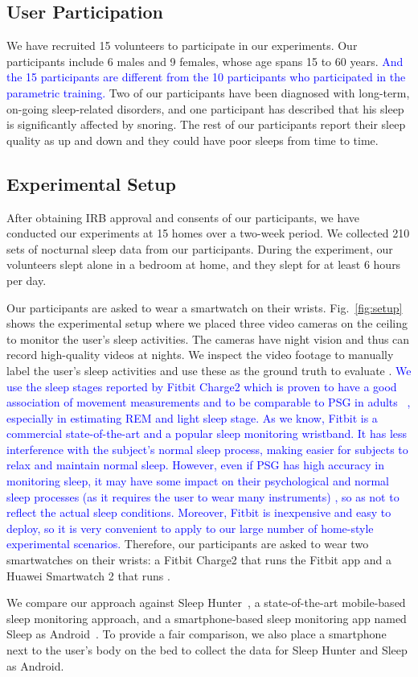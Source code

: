 \subsection{User Participation\label{sec:evalusers}} We have recruited 15 volunteers to participate in our experiments. Our
participants include 6 males and 9 females, whose age spans 15 to 60 years. \textcolor{blue}{And the 15 participants are different from the 10 participants who participated in the parametric training.} Two of our participants have been diagnosed with long-term,
on-going sleep-related disorders, and one participant has described that his sleep is significantly affected by snoring. The rest of our
participants report their sleep quality as up and down and they could have poor sleeps from time to time.

\subsection{Experimental Setup}
After obtaining IRB approval and consents of our participants, we have conducted our experiments at 15 homes over a two-week period. We
collected 210 sets of nocturnal sleep data from our participants. During the experiment, our volunteers slept alone in a bedroom at
home, and they slept for at least 6 hours per day.


Our participants are asked to wear a smartwatch on their wrists. Fig.~\ref{fig:setup} shows the experimental setup where we placed three
video cameras on the ceiling to monitor the user's sleep activities. The cameras have night vision and thus can record high-quality videos
at nights. We inspect the video footage to manually label the user's sleep activities and use these as the ground truth to evaluate \systemname. \textcolor{blue}{We use the sleep stages reported by Fitbit Charge2 which is proven to have a good association of movement measurements and to be comparable to PSG in adults ~\cite{evenson2015systematic,fitbit01,fitbit02,fitbit03}, especially in estimating REM and light sleep stage. As we know, Fitbit is a commercial state-of-the-art and a popular sleep monitoring wristband. It has less interference with the subject's normal sleep process, making easier for subjects to relax and maintain normal sleep. However, even if PSG has high accuracy in monitoring sleep, it may have some impact on their psychological and normal sleep processes (as it requires the user to wear many instruments) , so as not to reflect the actual sleep conditions. Moreover, Fitbit is inexpensive and easy to deploy, so it is very convenient to apply to our large number of home-style experimental scenarios.} Therefore, our participants are asked to wear two smartwatches on their wrists: a Fitbit Charge2 that runs the Fitbit app and a Huawei Smartwatch 2 that runs \systemname.

We compare our approach against Sleep Hunter~\cite{gu2016sleep}, a state-of-the-art mobile-based sleep monitoring approach, and a
smartphone-based sleep monitoring app named Sleep as Android~\cite{SleepAndroid}. To provide a fair comparison, we also place a smartphone
next to the user's body on the bed to collect the data for Sleep Hunter and Sleep as Android.
